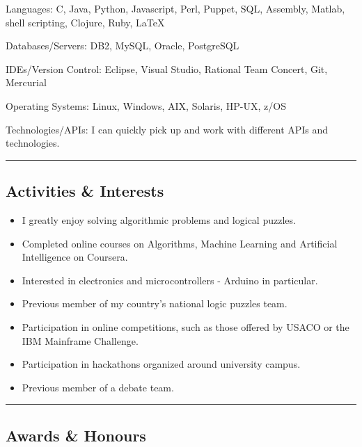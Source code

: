 \documentclass[10pt,letterpaper]{article}
\newenvironment{indentsection}[1]%
{\begin{list}{}%
    {\setlength{\leftmargin}{#1}}%
    \item[]%
}
{\end{list}}
\begin{document}
\begin{indentsection}{\parindent}
\begin{description*}
    \item[Languages:]
    C, Java, Python, Javascript, Perl, Puppet, SQL, Assembly, Matlab, shell scripting, Clojure, Ruby, \LaTeX
    \item[Databases/Servers:]
    DB2, MySQL, Oracle, PostgreSQL
    \item[IDEs/Version Control:]
    Eclipse, Visual Studio, Rational Team Concert, Git, Mercurial
    \item[Operating Systems:]
    Linux, Windows, AIX, Solaris, HP-UX, z/OS
    \item[Technologies/APIs:]
    I can quickly pick up and work with different APIs and technologies.

\end{description*}
\end{indentsection}

\hrule
\vspace{-0.4em}
\subsection*{Activities \& Interests}

\begin{itemize}
    \parskip=0.1em

    \item I greatly enjoy solving algorithmic problems and logical puzzles.
    \item Completed online courses on Algorithms, Machine Learning and Artificial Intelligence on Coursera.
    \item Interested in electronics and microcontrollers - Arduino in particular.
    \item Previous member of my country's national logic puzzles team.
    \item Participation in online competitions, such as those offered by USACO or the IBM Mainframe Challenge.
    \item Participation in hackathons organized around university campus.
    \item Previous member of a debate team.

\end{itemize}

\hrule
\vspace{-0.4em}
\subsection*{Awards \& Honours}
\end{document}
